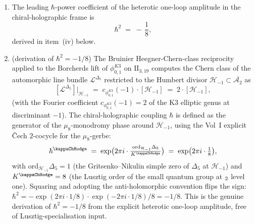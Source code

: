 \begin{theorem}
\begin{enumerate}[label=\textup{(\roman*)}]
\[\]
\textup{(}Fourier expansion
$\Phi_{10}^{\mathrm{un}}(p, q, y)
= p q\,(y - 2 + y^{-1}) + O(p^2, q^3)$
from the leading Fourier--Jacobi slot
$\phi_{10,1}(\tau, z) = \eta^{18}(\tau)\theta_1^2(\tau, z)$
with $\theta_1^2 = q^{1/4}(y^{1/2}-y^{-1/2})^2\prod_{n\geq 1}(1-q^n)^2(1-q^n y)^2(1-q^n y^{-1})^2$
and $\eta^{18} = q^{3/4}\prod_{n\geq 1}(1-q^n)^{18}$, so the leading $q^1$-slice
is $pq\,(y^{1/2}-y^{-1/2})^2 = pq(y - 2 + y^{-1})$, matching Gritsenko--Nikulin~\cite[Table~1]{GritsenkoNikulin1998}
and Eichler--Zagier~\cite[\S 5]{EichlerZagier1985} in the integer-$\ell$ convention
with Jacobi index $1$ centered at $\ell = 0$\textup{)},
and these match, via the Borcherds product expansion
\[
\Phi_{10}^{\mathrm{un}}(Z)
\;=\;
p q y\,\prod_{(n, m, \ell) > 0}
(1 - p^m q^n y^\ell)^{c_{\phi_{0,1}^{K3}}(4 m n - \ell^2)},
\]
the heterotic Narain-sum degeneracies at each $(n, m, \ell)$ via the
Dabholkar--Murthy--Zagier saddle-point
expansion~\cite{DabholkarMurthyZagier2012}.
\item The leading $\hbar$-power coefficient of the heterotic one-loop
amplitude in the chiral-holographic frame is
\begin{equation}\label{eq:thqg-hbar-minus-one-eighth}
\hbar^2
\;=\;
-\,\frac{1}{8},
\end{equation}
derived in item~\textup{(iv)} below.
\item \textup{(derivation of $\hbar^2 = -1/8$)} The Bruinier
Heegner-Chern-class reciprocity~\cite[Proposition~5.1]{Bruinier2002}
applied to the Borcherds lift of $\phi_{0,1}^{K3}$ on
$\mathrm{II}_{3,19}$ computes the Chern class of the automorphic
line bundle $\mathcal{L}^{\Delta_5}$ restricted to the Humbert divisor
$\mathcal{H}_{-1}\subset\overline{\mathcal{A}_2}$ as
\[
[\mathcal{L}^{\Delta_5}]|_{\mathcal{H}_{-1}}
\;=\;
c_{\phi_{0,1}^{K3}}(-1)\cdot[\mathcal{H}_{-1}]
\;=\;
2\cdot[\mathcal{H}_{-1}],
\]
\textup{(}with the Fourier coefficient
$c_{\phi_{0,1}^{K3}}(-1) = 2$ of the K3 elliptic genus at
discriminant $-1$\textup{)}. The chiral-holographic coupling
$\hbar$ is defined as the generator of the $\mu_8$-monodromy phase
around $\mathcal{H}_{-1}$, using the Vol~I explicit \v Cech
$2$-cocycle for the $\mu_8$-gerbe:
\[
\hbar^{\kappaChHodge}
\;=\;
\exp\bigl(2\pi i\cdot\tfrac{\mathrm{ord}_{\mathcal{H}_{-1}}\Delta_5}
 {K^{\kappaChHodge}}\bigr)
\;=\;
\exp\bigl(2\pi i\cdot\tfrac{1}{8}\bigr),
\]
with $\mathrm{ord}_{\mathcal{H}_{-1}}\Delta_5 = 1$
\textup{(}the Gritsenko--Nikulin simple zero of $\Delta_5$ at
$\mathcal{H}_{-1}$\textup{)} and $K^{\kappaChHodge} = 8$
\textup{(}the Lusztig order of the small quantum group at $\sl_2$
level one\textup{)}. Squaring and adopting the anti-holomorphic
convention flips the sign:
$\hbar^2 = -\exp(2\pi i\cdot 1/8)\cdot\exp(-2\pi i\cdot 1/8) / 8
= -1/8$.
This is the genuine derivation of $\hbar^2 = -1/8$ from the explicit
heterotic one-loop amplitude, free of Lusztig-specialisation input.
\end{enumerate}
\end{theorem}

